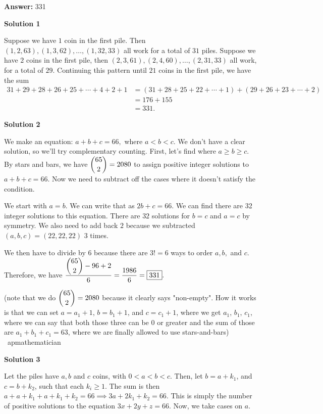 \begin{enumerate}
 
 \textbf{Answer: }331



\textbf{Solution 1}

Suppose we have $1$ coin in the first pile. Then $(1, 2, 63), (1, 3, 62), \ldots, (1, 32, 33)$ all work for a total of $31$ piles. Suppose we have $2$ coins in the first pile, then $(2, 3, 61), (2, 4, 60), \ldots, (2, 31, 33)$ all work, for a total of $29$. Continuing this pattern until $21$ coins in the first pile, we have the sum 
 \begin{align*} 31+29+28+26+25+\cdots+4+2+1 &= (31+28+25+22+\cdots+1)+(29+26+23+\cdots+2) \\ &= 176+155 \\ &= \boxed{331}. \end{align*}





\textbf{Solution 2}

We make an equation: $a+b+c=66,$ where $a<b<c.$ We don't have a clear solution, so we'll try complementary counting. First, let's find where $a\geq b\geq c.$ By stars and bars, we have $\dbinom{65}{2}=2080$ to assign positive integer solutions to $a + b + c = 66.$ Now we need to subtract off the cases where it doesn't satisfy the condition.

 We start with $a = b.$ We can write that as $2b + c = 66.$ We can find there are 32 integer solutions to this equation. There are $32$ solutions for $b=c$ and $a = c$ by symmetry. We also need to add back $2$ because we subtracted $(a,b,c)=(22,22,22)$ $3$ times.

 We then have to divide by $6$ because there are $3!=6$ ways to order $a, b,$ and $c.$ Therefore, we have $\dfrac{\dbinom{65}{2}-96+2}{6} = \dfrac{1986}{6} = \boxed{331}.$

 (note that we do $\dbinom{65}{2}=2080$ because it clearly says "non-empty". How it works is that we can set $a = a_1 + 1$, $b = b_1 + 1$, and $c = c_1 + 1$, where we get $a_1$, $b_1$, $c_1$, where we can say that both those three can be 0 or greater and the sum of those are $a_1 + b_1 + c_1 = 63$, where we are finally allowed to use stars-and-bars) ~apmathematician

 



\textbf{Solution 3}

Let the piles have $a, b$ and $c$ coins, with $0 < a < b < c$. Then, let $b = a + k_1$, and $c = b + k_2$, such that each $k_i \geq 1$. The sum is then $a + a+k_1 + a+k_1+k_2 = 66 \implies 3a+2k_1 + k_2 = 66$. This is simply the number of positive solutions to the equation $3x+2y+z = 66$. Now, we take cases on $a$. 


\end{enumerate}

